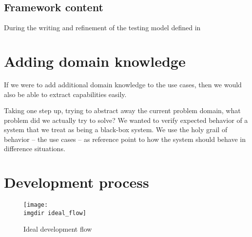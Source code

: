 \subsection{Framework content}

During the writing and refinement of the testing model defined in 


\section{Adding domain knowledge}
If we were to add additional domain knowledge to the use cases, then we would also be able to extract capabilities easily.

Taking one step up, trying to abstract away the current problem domain, what problem did we actually try to solve? We wanted to verify expected behavior of a system that we treat as being a black-box system. We use the holy grail of behavior -- the use cases -- as reference point to how the system should behave in difference situations.



\section{Development process}
\begin{figure}[ht]
\centering
\texttt{[image: \\imgdir ideal\_flow]}
\caption{Ideal development flow}
\label{fig:ideal_flow}
\end{figure}
